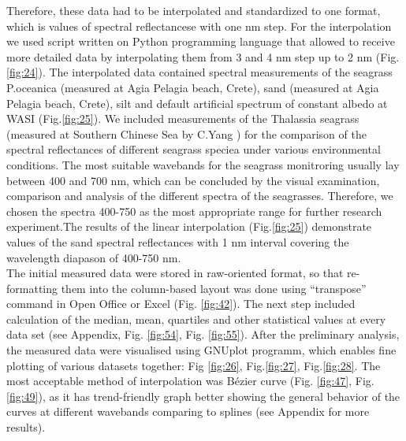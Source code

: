 \documentclass[10pt, a4paper]{article}
\begin{document}
Therefore, these data had to be interpolated and standardized to one
format, which is values of spectral reflectancese with one nm step. For the
interpolation we used script written on Python programming language that allowed to receive more 
detailed data by interpolating them from 3 and 4 nm step up to 2 nm (Fig.\ref{fig:24}).
The interpolated data contained spectral measurements of the seagrass P.oceanica (measured at Agia
Pelagia beach, Crete), sand (measured at Agia Pelagia beach, Crete), silt and default artificial
spectrum of constant albedo at WASI (Fig.\ref{fig:25}). 
We included measurements of the Thalassia seagrass
(measured at Southern Chinese Sea by C.Yang \cite{Yang10} \label{Yang10}) for the comparison of the spectral reflectances of
different seagrass speciea under various environmental conditions.
The most suitable wavebands for the seagrass monitroring usually lay between 400 and 700 nm,
which can be concluded by the visual examination, comparison and analysis of the different spectra of
the seagrasses. Therefore, we chosen the spectra 400-750 as the most appropriate range for
further research experiment.The results of the linear interpolation (Fig.\ref{fig:25}) demonstrate values of the
sand spectral reflectances with 1 nm interval covering the wavelength diapason of 400-750 nm.\\
The initial measured data were stored in raw-oriented format, so that re-formatting them into the
column-based layout was done using “transpose” command in Open Office or Excel (Fig. \ref{fig:42}). The next step included
calculation of the median, mean, quartiles and other statistical values at every data set (see Appendix, Fig. \ref{fig:54}, Fig. \ref{fig:55}).
After the preliminary analysis, the measured data were visualised using GNUplot programm, which
enables fine plotting of various datasets together: Fig \ref{fig:26}, Fig.\ref{fig:27}, Fig.\ref{fig:28}. The most acceptable method of interpolation was B\'ezier curve (Fig. \ref{fig:47}, Fig. \ref{fig:49}),
as it has trend-friendly graph better showing the general behavior of the curves at different wavebands
comparing to splines (see Appendix for more results). 
\end{document}
